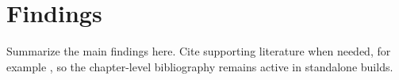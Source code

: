 \section{Findings}

Summarize the main findings here. Cite supporting literature when needed, for example \textcite{doe2026}, so the chapter-level bibliography remains active in standalone builds.
